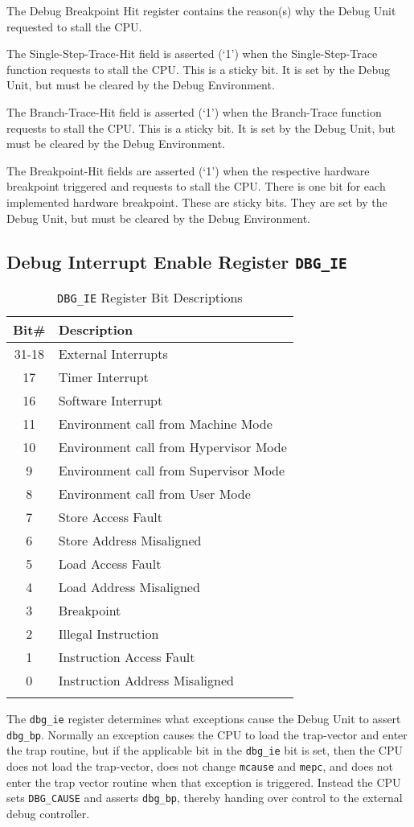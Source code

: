 The Debug Breakpoint Hit register contains the reason(s) why the Debug
Unit requested to stall the CPU.

The Single-Step-Trace-Hit field is asserted (`1') when the
Single-Step-Trace function requests to stall the CPU. This is a sticky
bit. It is set by the Debug Unit, but must be cleared by the Debug
Environment.

The Branch-Trace-Hit field is asserted (`1') when the Branch-Trace
function requests to stall the CPU. This is a sticky bit. It is set by
the Debug Unit, but must be cleared by the Debug Environment.

The Breakpoint-Hit fields are asserted (`1') when the respective
hardware breakpoint triggered and requests to stall the CPU. There is
one bit for each implemented hardware breakpoint. These are sticky bits.
They are set by the Debug Unit, but must be cleared by the Debug
Environment.

\subsection{Debug Interrupt Enable Register \texttt{DBG\_IE}} \label{debug-interrupt-enable-register-dbg_ie}



\begin{longtable}[]{@{}cl@{}}
	\toprule
	\textbf{Bit\#} & \textbf{Description}\tabularnewline
	\midrule

	\endhead
	31-18 & External Interrupts\tabularnewline
	17 & Timer Interrupt\tabularnewline
	16 & Software Interrupt\tabularnewline
	11 & Environment call from Machine Mode\tabularnewline
	10 & Environment call from Hypervisor Mode\tabularnewline
	9 & Environment call from Supervisor Mode\tabularnewline
	8 & Environment call from User Mode\tabularnewline
	7 & Store Access Fault\tabularnewline
	6 & Store Address Misaligned\tabularnewline
	5 & Load Access Fault\tabularnewline
	4 & Load Address Misaligned\tabularnewline
	3 & Breakpoint\tabularnewline
	2 & Illegal Instruction\tabularnewline
	1 & Instruction Access Fault\tabularnewline
	0 & Instruction Address Misaligned\tabularnewline
	\bottomrule
	\caption{\texttt{DBG\_IE} Register Bit Descriptions}
	\label{tab:dbg-ie-reg-bits}
\end{longtable}

The \texttt{dbg\_ie} register determines what exceptions cause the Debug Unit to
assert \texttt{dbg\_bp}. Normally an exception causes the CPU to load the
trap-vector and enter the trap routine, but if the applicable bit in the
\texttt{dbg\_ie} bit is set, then the CPU does not load the trap-vector, does not
change \texttt{mcause} and \texttt{mepc}, and does not enter the trap vector routine when
that exception is triggered. Instead the CPU sets \texttt{DBG\_CAUSE} and asserts
\texttt{dbg\_bp}, thereby handing over control to the external debug controller.

